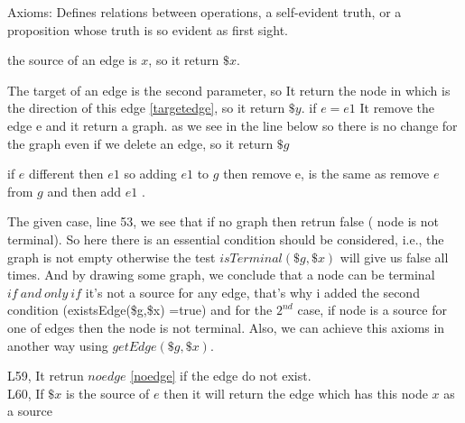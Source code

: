\item \textcolor{colour0}{Axioms}\label{axiom}: Defines relations between operations, a self-evident truth, or a proposition whose truth is so evident as first sight.


\bigskip\noindent

the source of an edge is $x$, so it return $\$x$.
\bigskip\noindent

The target of an edge is the second parameter, so It return the node in which is the direction of this edge \ref{targetedge}, so it return $\$y$.
\bigskip\noindent
 \label{cons}
if $e = e1$ It remove the edge e and it return a graph.
as we see in the line below
\vspace{-2mm}
\vspace{-3mm}so there is no change for the graph even if we delete an edge, so it return $\$g$

\bigskip\noindent

if $e$ different then $e1$ so adding $e1$ to $g$ then remove e, is the same as remove $e$ from $g$ and then add $e1$ .
\bigskip\noindent


The given case, line 53, we see that if no graph then retrun false ( node is not terminal). So here there is an essential condition should be considered, i.e., the graph is not empty otherwise the test $isTerminal(\$g, \$x)$ will give us false all times.
And by drawing some graph, we conclude that a node can be terminal  $if\ and \ only \ if $ it's not a source for any edge, that's why i added the second condition (existsEdge(\$g,\$x) =true) and for the $2^{nd} $ case, if node is a source for one of edges then the node is not terminal. Also,
we can achieve this axioms in another way using $getEdge(\$g,\$x)$.
\bigskip\noindent

L59, It retrun $noedge$ \ref{noedge} if the edge do not exist.\\
L60, If $\$x$ is the source of $e$ then it will return the edge which has this node $x$ as a source \label{axiomgetedge}

